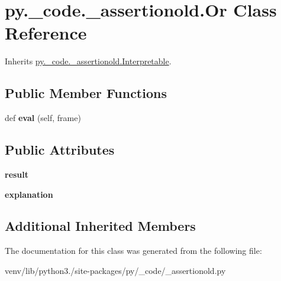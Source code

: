 \hypertarget{classpy_1_1__code_1_1__assertionold_1_1_or}{}\section{py.\+\_\+code.\+\_\+assertionold.\+Or Class Reference}
\label{classpy_1_1__code_1_1__assertionold_1_1_or}


Inherits \hyperlink{classpy_1_1__code_1_1__assertionold_1_1_interpretable}{py.\+\_\+code.\+\_\+assertionold.\+Interpretable}.

\subsection*{Public Member Functions}
\begin{DoxyCompactItemize}
\item 
\mbox{\label{classpy_1_1__code_1_1__assertionold_1_1_or_a9ef29a66fb3bb8a23c55beb86bb656b6}} 
def {\bfseries eval} (self, frame)
\end{DoxyCompactItemize}
\subsection*{Public Attributes}
\begin{DoxyCompactItemize}
\item 
\mbox{\label{classpy_1_1__code_1_1__assertionold_1_1_or_a8859eef67c4ea4e9afa9c79c9517cdd8}} 
{\bfseries result}
\item 
\mbox{\label{classpy_1_1__code_1_1__assertionold_1_1_or_a337741ee674c9dcf3bdb38b7150d25db}} 
{\bfseries explanation}
\end{DoxyCompactItemize}
\subsection*{Additional Inherited Members}


The documentation for this class was generated from the following file\+:\begin{DoxyCompactItemize}
\item 
venv/lib/python3./site-\/packages/py/\+\_\+code/\+\_\+assertionold.\+py\end{DoxyCompactItemize}
